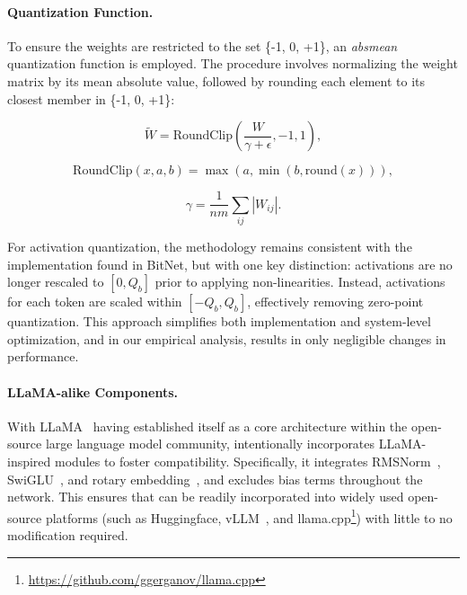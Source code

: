 \paragraph{Quantization Function.} To ensure the weights are restricted to the set \{-1, 0, +1\}, an \emph{absmean} quantization function is employed. The procedure involves normalizing the weight matrix by its mean absolute value, followed by rounding each element to its closest member in \{-1, 0, +1\}:

\begin{equation}
    \widetilde{W} = \mathrm{RoundClip}(\frac{W}{\gamma + \epsilon}, -1, 1),
\end{equation}

\begin{equation}
    \mathrm{RoundClip}(x, a, b) = \max(a, \min(b, \mathrm{round}(x))),
\end{equation}

\begin{equation}
    \gamma = \frac{1}{nm}\sum_{ij} |W_{ij}|.
\end{equation}

For activation quantization, the methodology remains consistent with the implementation found in BitNet, but with one key distinction: activations are no longer rescaled to $[0, Q_b]$ prior to applying non-linearities. Instead, activations for each token are scaled within $[-Q_b, Q_b]$, effectively removing zero-point quantization. This approach simplifies both implementation and system-level optimization, and in our empirical analysis, results in only negligible changes in performance.

\paragraph{LLaMA-alike Components.}

With LLaMA~\cite{llama, llama2} having established itself as a core architecture within the open-source large language model community,  intentionally incorporates LLaMA-inspired modules to foster compatibility. Specifically, it integrates RMSNorm~\cite{rmsnorm}, SwiGLU~\cite{swiglu}, and rotary embedding~\cite{rope}, and excludes bias terms throughout the network. This ensures that  can be readily incorporated into widely used open-source platforms (such as Huggingface, vLLM~\cite{vllm}, and llama.cpp\footnote{\url{https://github.com/ggerganov/llama.cpp}}) with little to no modification required.

